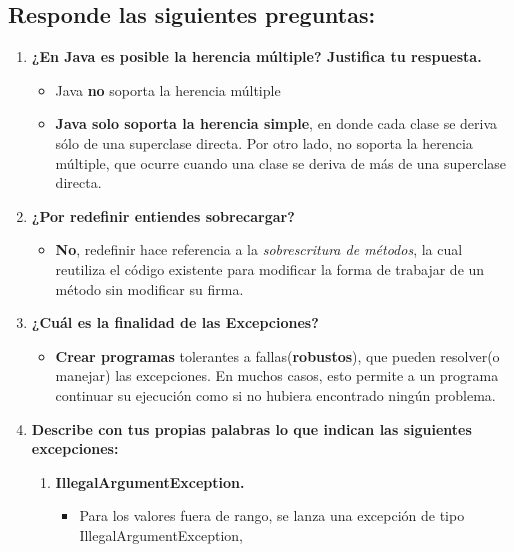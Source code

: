 \documentclass{report}
\begin{document}
\subsection*{Responde las siguientes preguntas:}
    \begin{enumerate}
	    \item \textbf{¿En Java es posible la herencia múltiple? Justifica tu respuesta.}
            \begin{itemize}
                \item Java \textbf{no} soporta la herencia múltiple
                \item \textbf{Java solo soporta la herencia simple}, en donde cada clase se deriva sólo de una superclase
                      directa. Por otro lado, no soporta la herencia múltiple, que ocurre cuando una clase se 
                      deriva de más de una superclase directa.
            \end{itemize}
        \item \textbf{¿Por redefinir entiendes sobrecargar?}
            \begin{itemize}
                \item \textbf{No}, redefinir hace referencia a la \textit{sobrescritura de métodos}, la cual reutiliza
                      el código existente para modificar la forma de trabajar de un método sin modificar su firma. 
            \end{itemize}
        \item \textbf{¿Cuál es la finalidad de las Excepciones?}
            \begin{itemize}
                \item \textbf{Crear programas} tolerantes a fallas(\textbf{robustos}), que pueden resolver(o manejar) las excepciones.
                      En muchos casos, esto permite a un programa continuar su ejecución como si no hubiera encontrado
                      ningún problema. 
            \end{itemize}
        \item \textbf{Describe con tus propias palabras lo que indican las siguientes excepciones: }
            \begin{enumerate}
                \item \textbf{IllegalArgumentException.} 
                    \begin{itemize}
                        \item Para los valores fuera de rango, se lanza una excepción de tipo IllegalArgumentException,

\end{itemize}
\end{enumerate}
\end{enumerate}
\end{document}
